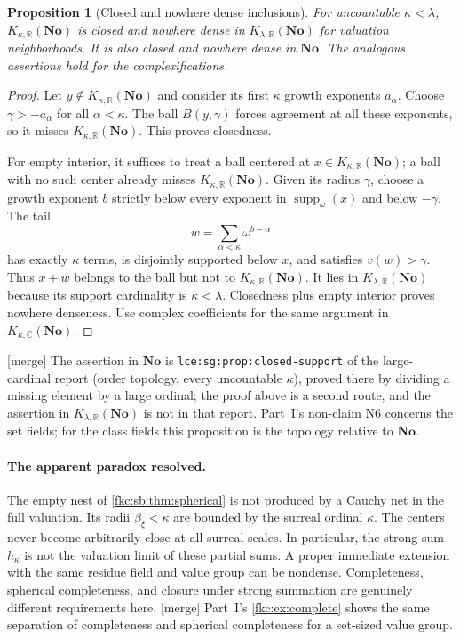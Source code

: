 \documentclass[11pt,letterpaper]{article}
\numberwithin{equation}{section}
\newtheorem{proposition}[theorem]{Proposition}
\theoremstyle{definition}
\theoremstyle{remark}
\newcommand{\R}{\mathbb R}
\newcommand{\C}{\mathbb C}
\newcommand{\No}{\mathbf{No}}
\newcommand{\mergetag}{\textup{\textsf{\small[merge]}}}%
\newcommand{\suppw}{\operatorname{supp}_{\omega}}
\newcommand{\KN}[2]{K_{#1,#2}(\No)}%
\newcommand{\lbl}[1]{\nolinkurl{#1}}%
\begin{document}
\begin{proposition}[Closed and nowhere dense inclusions]\label{fkc:sb:prop:closed}
For uncountable $\kappa<\lambda$, $\KN\kappa\R$ is closed and nowhere dense in $\KN\lambda\R$ for valuation neighborhoods. It is also closed and nowhere dense in $\No$. The analogous assertions hold for the complexifications.
\end{proposition}
\begin{proof}
Let $y\notin\KN\kappa\R$ and consider its first $\kappa$ growth exponents $a_\alpha$. Choose $\gamma>-a_\alpha$ for all $\alpha<\kappa$. The ball $B(y,\gamma)$ forces agreement at all these exponents, so it misses $\KN\kappa\R$. This proves closedness.

For empty interior, it suffices to treat a ball centered at $x\in\KN\kappa\R$; a ball with no such center already misses $\KN\kappa\R$. Given its radius $\gamma$, choose a growth exponent $b$ strictly below every exponent in $\suppw(x)$ and below $-\gamma$. The tail
\[
 w=\sum_{\alpha<\kappa}\omega^{b-\alpha}
\]
has exactly $\kappa$ terms, is disjointly supported below $x$, and satisfies $v(w)>\gamma$. Thus $x+w$ belongs to the ball but not to $\KN\kappa\R$. It lies in $\KN\lambda\R$ because its support cardinality is $\kappa<\lambda$. Closedness plus empty interior proves nowhere denseness. Use complex coefficients for the same argument in $\KN\kappa\C$.
\end{proof}
\mergetag{} The assertion in $\No$ is \lbl{lce:sg:prop:closed-support} of the large-cardinal report (order topology, every uncountable $\kappa$), proved there by dividing a missing element by a large ordinal; the proof above is a second route, and the assertion in $\KN\lambda\R$ is not in that report. Part~I's non-claim N6 concerns the set fields; for the class fields this proposition is the topology relative to $\No$.

\paragraph{The apparent paradox resolved.}
The empty nest of \cref{fkc:sb:thm:spherical} is not produced by a Cauchy net in the full valuation. Its radii $\beta_\xi<\kappa$ are bounded by the surreal ordinal $\kappa$. The centers never become arbitrarily close at all surreal scales. In particular, the strong sum $h_\kappa$ is not the valuation limit of these partial sums. A proper immediate extension with the same residue field and value group can be nondense. Completeness, spherical completeness, and closure under strong summation are genuinely different requirements here. \mergetag{} Part~I's \cref{fkc:ex:complete} shows the same separation of completeness and spherical completeness for a set-sized value group.
\end{document}
